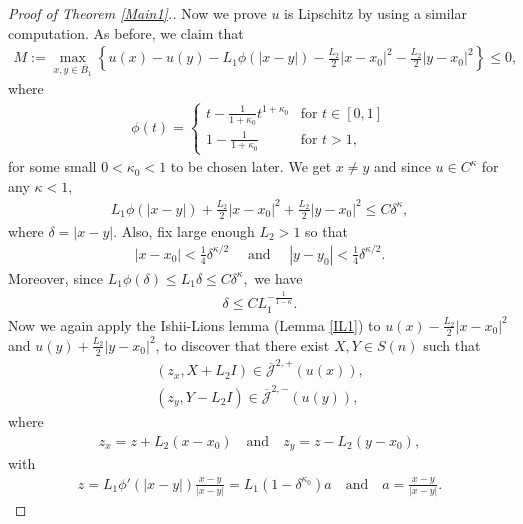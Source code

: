 \documentclass[reqno]{amsart}
\theoremstyle{plain}
\theoremstyle{definition}
\theoremstyle{remark}
\numberwithin{equation}{section}
\begin{document}
\begin{proof}[Proof of Theorem \ref{Main1}.]
     Now we prove $u$ is Lipschitz by using a similar computation.
     As before, we claim that 
     \begin{align*}
        M:= \max_{x,y\in \overline{B_1}} \left\{ u(x) - u(y) - L_1\phi(|x-y|) - \frac{L_2}{2}|x-x_0|^2 -\frac{L_2}{2}|y-x_0|^2 \right\} \leq 0,
    \end{align*}
    where
    \begin{align*}
        \phi(t) = 
        \begin{cases}
            t-\frac{1}{1+\kappa_0}t^{1+\kappa_0} &\text{for } t\in[0,1] \\
            1-\frac{1}{1+\kappa_0} &\text{for } t>1,
        \end{cases}
    \end{align*}
    for some small $0<\kappa_0<1$ to be chosen later.
    We get $x \neq y$ and since $u \in C^\kappa$ for any $\kappa<1$,
    \begin{align*}
        L_1 \phi(|x-y|) + \frac{L_2}{2}|x-x_0|^2 +\frac{L_2}{2}|y-x_0|^2  \leq C\delta^{\kappa},
    \end{align*}
    where $\delta = |x-y|$. Also, fix large enough $L_2>1$ so that 
    \begin{align}
        |x-x_0| < \frac{1}{4}\delta^{\kappa/2} \quad \text{ and } \quad  |y-y_0| < \frac{1}{4}\delta^{\kappa/2}.
    \end{align}
    Moreover, since $L_1\phi(\delta) \leq L_1 \delta \leq C\delta^\kappa,$ we have
    \begin{align} \label{dest2}
        \delta \leq CL_1^{-\frac{1}{1-\kappa}}.
    \end{align}
    Now we again apply the Ishii-Lions lemma (Lemma \ref{IL1}) to $u(x)- \frac{L_2}{2}|x-x_0|^2$ and $u(y) + \frac{L_2}{2}|y-x_0|^2$, to discover that there exist $X,Y \in S(n)$ such that
     \begin{align*}
         (z_x, X+L_2I)\in \overline{\mathcal{J}}^{2,+} \left( u(x)\right), \\
         (z_y, Y-L_2I)\in \overline{\mathcal{J}}^{2,-} \left( u(y)\right),
     \end{align*}
     where
     \begin{align*}
         z_x = z+L_2(x-x_0) \quad \text{and} \quad z_y = z-L_2(y-x_0),
     \end{align*}
    with
     \begin{align} \label{zest}
         z= L_1\phi'(|x-y|)\frac{x-y}{|x-y|} = L_1(1-\delta^{\kappa_0}) a \quad \text{and} \quad a= \frac{x-y}{|x-y|}.
         \end{align}

\end{proof}
\end{document}
